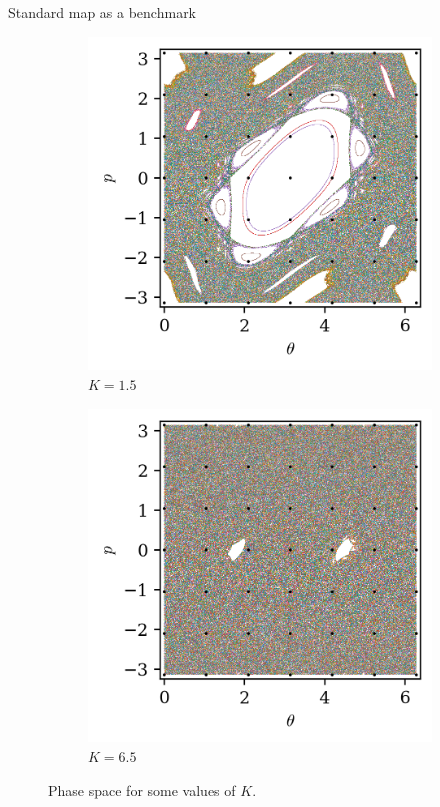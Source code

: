 \documentclass[10pt]{beamer}
\begin{document}
\begin{frame}{Standard map as a benchmark}
\begin{figure}
\begin{subfigure}[b]{0.3\textwidth}
            \includegraphics[width=\textwidth]{std/map_1_1.5000.png}
            \caption{$K = 1.5$}
        \end{subfigure}
        \begin{subfigure}[b]{0.3\textwidth}
            \includegraphics[width=\textwidth]{std/map_1_6.5000.png}
            \caption{$K = 6.5$}
        \end{subfigure}
        \caption{Phase space for some values of $K$.}
        \label{pspace}
    \end{figure}
\end{frame}
\end{document}

